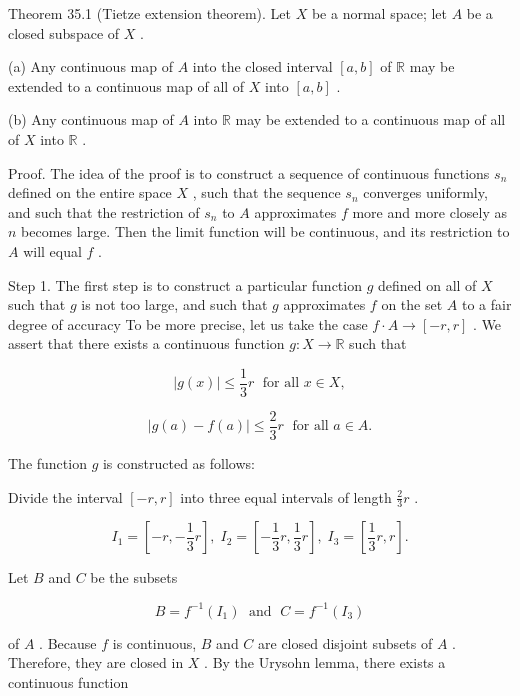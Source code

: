 \documentclass[10pt]{article}
\begin{document}
Theorem 35.1 (Tietze extension theorem). Let \(X\) be a normal space; let \(A\) be a closed subspace of \(X\) .

(a) Any continuous map of \(A\) into the closed interval \(\left\lbrack  {a,b}\right\rbrack\) of \(\mathbb{R}\) may be extended to a continuous map of all of \(X\) into \(\left\lbrack  {a,b}\right\rbrack\) .

(b) Any continuous map of \(A\) into \(\mathbb{R}\) may be extended to a continuous map of all of \(X\) into \(\mathbb{R}\) .

Proof. The idea of the proof is to construct a sequence of continuous functions \({s}_{n}\) defined on the entire space \(X\) , such that the sequence \({s}_{n}\) converges uniformly, and such that the restriction of \({s}_{n}\) to \(A\) approximates \(f\) more and more closely as \(n\) becomes large. Then the limit function will be continuous, and its restriction to \(A\) will equal \(f\) .

Step 1. The first step is to construct a particular function \(g\) defined on all of \(X\) such that \(g\) is not too large, and such that \(g\) approximates \(f\) on the set \(A\) to a fair degree of accuracy To be more precise, let us take the case \(f \cdot  A \rightarrow  \left\lbrack  {-r,r}\right\rbrack\) . We assert that there exists a continuous function \(g : X \rightarrow  \mathbb{R}\) such that

\[
\left| {g\left( x\right) }\right|  \leq  \frac{1}{3}r\;\text{ for all }x \in  X,
\]

\[
\left| {g\left( a\right)  - f\left( a\right) }\right|  \leq  \frac{2}{3}r\;\text{ for all }a \in  A.
\]

The function \(g\) is constructed as follows:

Divide the interval \(\left\lbrack  {-r,r}\right\rbrack\) into three equal intervals of length \(\frac{2}{3}r\) .

\[
{I}_{1} = \left\lbrack  {-r, - \frac{1}{3}r}\right\rbrack  ,\;{I}_{2} = \left\lbrack  {-\frac{1}{3}r,\frac{1}{3}r}\right\rbrack  ,\;{I}_{3} = \left\lbrack  {\frac{1}{3}r,r}\right\rbrack  .
\]

Let \(B\) and \(C\) be the subsets

\[
B = {f}^{-1}\left( {I}_{1}\right) \;\text{ and }\;C = {f}^{-1}\left( {I}_{3}\right)
\]

of \(A\) . Because \(f\) is continuous, \(B\) and \(C\) are closed disjoint subsets of \(A\) . Therefore, they are closed in \(X\) . By the Urysohn lemma, there exists a continuous function
\end{document}
